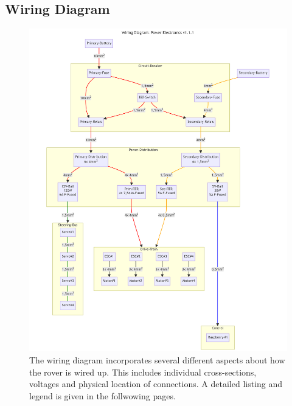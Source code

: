     \clearpage

    \subsection{Wiring Diagram}

    \begin{figure}[h!]
    \centering
    \includegraphics[width=1\textwidth]{contents/figures/wiring-diagram-p-v1.1.1.png}
    \caption{The wiring diagram incorporates several different aspects about how the rover is wired up. This includes individual cross-sections, voltages and physical location of connections. A detailed listing and legend is given in the follwowing pages.}
    \label{wiring_power}
    \end{figure}

    \clearpage

